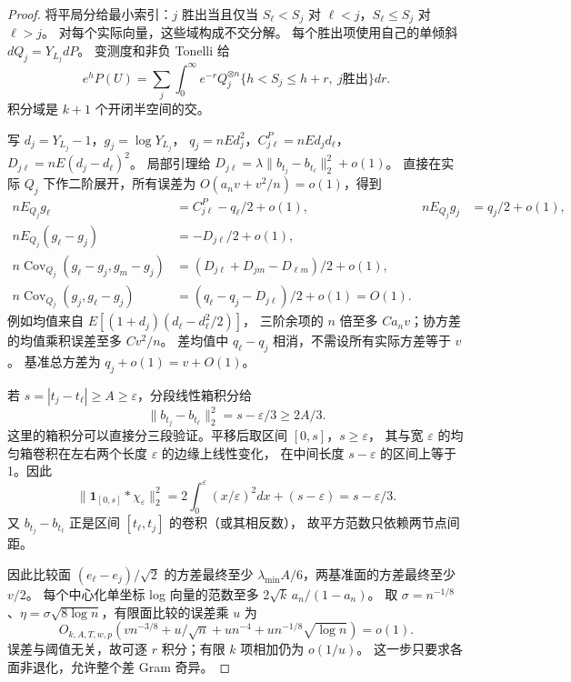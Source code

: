 \documentclass[UTF8,a4paper,11pt,fontset=fandol]{ctexart}
\theoremstyle{remark}
\begin{document}
\begin{proof}
将平局分给最小索引：$j$ 胜出当且仅当
$S_\ell<S_j$ 对 $\ell<j$，$S_\ell\le S_j$ 对 $\ell>j$。
对每个实际向量，这些域构成不交分解。
每个胜出项使用自己的单倾斜 $dQ_j=Y_{L_j}dP$。
变测度和非负 Tonelli 给
\begin{equation}\label{eq:paperwinneridentity}
 e^hP(U)=\sum_j\int_0^\infty e^{-r}
 Q_j^{\otimes n}\{h<S_j\le h+r,\ j\text{胜出}\}dr.
\end{equation}
积分域是 $k+1$ 个开闭半空间的交。

写 $d_j=Y_{L_j}-1$，$g_j=\log Y_{L_j}$，
$q_j=nEd_j^2$，$C^P_{j\ell}=nEd_jd_\ell$，
$D_{j\ell}=nE(d_j-d_\ell)^2$。
局部引理给 $D_{j\ell}=\lambda\|b_{t_j}-b_{t_\ell}\|_2^2+o(1)$。
直接在实际 $Q_j$ 下作二阶展开，所有误差为 $O(a_nv+v^2/n)=o(1)$，得到
\begin{align*}
 nE_{Q_j}g_\ell&=C^P_{j\ell}-q_\ell/2+o(1),&nE_{Q_j}g_j&=q_j/2+o(1),\\
 nE_{Q_j}(g_\ell-g_j)&=-D_{j\ell}/2+o(1),\\
 n\operatorname{Cov}_{Q_j}(g_\ell-g_j,g_m-g_j)
 &=(D_{j\ell}+D_{jm}-D_{\ell m})/2+o(1),\\
 n\operatorname{Cov}_{Q_j}(g_j,g_\ell-g_j)
 &=(q_\ell-q_j-D_{j\ell})/2+o(1)=O(1).
\end{align*}
例如均值来自 $E[(1+d_j)(d_\ell-d_\ell^2/2)]$，
三阶余项的 $n$ 倍至多 $Ca_nv$；协方差的均值乘积误差至多 $Cv^2/n$。
差均值中 $q_\ell-q_j$ 相消，不需设所有实际方差等于 $v$。
基准总方差为 $q_j+o(1)=v+O(1)$。

若 $s=|t_j-t_\ell|\ge A\ge\varepsilon$，分段线性箱积分给
\[
 \|b_{t_j}-b_{t_\ell}\|_2^2=s-\varepsilon/3\ge2A/3.
\]
这里的箱积分可以直接分三段验证。平移后取区间 $[0,s]$，$s\ge\varepsilon$，
其与宽 $\varepsilon$ 的均匀箱卷积在左右两个长度 $\varepsilon$ 的边缘上线性变化，
在中间长度 $s-\varepsilon$ 的区间上等于1。因此
\[
 \|\mathbf1_{[0,s]}*\chi_\varepsilon\|_2^2
 =2\int_0^\varepsilon(x/\varepsilon)^2dx+(s-\varepsilon)
 =s-\varepsilon/3.
\]
又 $b_{t_j}-b_{t_\ell}$ 正是区间 $[t_\ell,t_j]$ 的卷积（或其相反数），
故平方范数只依赖两节点间距。

因此比较面 $(e_\ell-e_j)/\sqrt2$ 的方差最终至少
$\lambda_{\min}A/6$，两基准面的方差最终至少 $v/2$。
每个中心化单坐标 log 向量的范数至多 $2\sqrt k\,a_n/(1-a_n)$。
取 $\sigma=n^{-1/8}$、$\eta=\sigma\sqrt{8\log n}$，有限面比较的误差乘 $u$ 为
\[
 O_{k,A,T,w,p}(vn^{-3/8}+u/\sqrt n+un^{-4}
 +un^{-1/8}\sqrt{\log n})=o(1).
\]
误差与阈值无关，故可逐 $r$ 积分；有限 $k$ 项相加仍为 $o(1/u)$。
这一步只要求各面非退化，允许整个差 Gram 奇异。


\end{proof}
\end{document}
